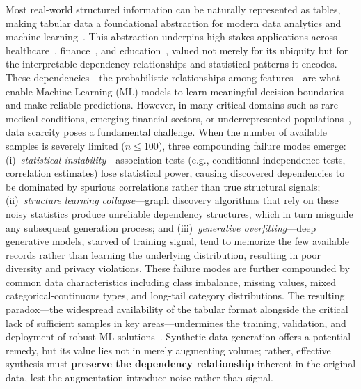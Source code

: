 Most real-world structured information can be naturally represented as tables, making tabular data a foundational abstraction for modern data analytics and machine learning~\cite{jonker2025structured_unstructured_ibm}. This abstraction underpins high-stakes applications across healthcare~\cite{choi2017generating}, finance~\cite{rundo2019machine}, and education~\cite{luan2021review}, valued not merely for its ubiquity but for the interpretable dependency relationships and statistical patterns it encodes.
These dependencies---the probabilistic relationships among features---are what enable Machine Learning (ML) models to learn meaningful decision boundaries and make reliable predictions.
However, in many critical domains such as rare medical conditions, emerging financial sectors, or underrepresented populations~\cite{fonseca2023tabular}, data scarcity poses a fundamental challenge.
When the number of available samples is severely limited ($n \le 100$), three compounding failure modes emerge: (i)~\emph{statistical instability}---association tests (e.g., conditional independence tests, correlation estimates) lose statistical power, causing discovered dependencies to be dominated by spurious correlations rather than true structural signals; (ii)~\emph{structure learning collapse}---graph discovery algorithms that rely on these noisy statistics produce unreliable dependency structures, which in turn misguide any subsequent generation process; and (iii)~\emph{generative overfitting}---deep generative models, starved of training signal, tend to memorize the few available records rather than learning the underlying distribution, resulting in poor diversity and privacy violations.
These failure modes are further compounded by common data characteristics including class imbalance, missing values, mixed categorical-continuous types, and long-tail category distributions.
The resulting paradox---the widespread availability of the tabular format alongside the critical lack of sufficient samples in key areas---undermines the training, validation, and deployment of robust ML solutions~\cite{chai2022data, borisov2022deep}.
Synthetic data generation offers a potential remedy, but its value lies not in merely augmenting volume; rather, effective synthesis must \textbf{preserve the dependency relationship} inherent in the original data, lest the augmentation introduce noise rather than signal.

